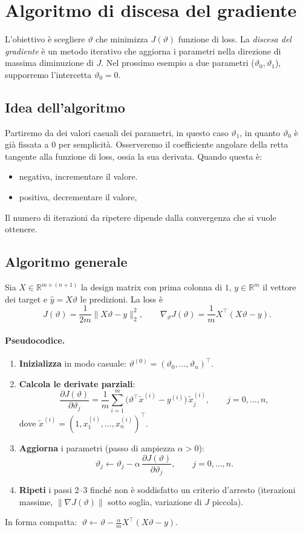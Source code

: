 \section{Algoritmo di discesa del gradiente}
L’obiettivo è scegliere \(\vartheta\) che minimizza \(J(\vartheta)\) funzione di loss. La \emph{discesa del gradiente}
è un metodo iterativo che aggiorna i parametri nella direzione di massima diminuzione di \(J\).
Nel prossimo esempio a due parametri ($\vartheta_0, \vartheta_1$), supporremo l'intercetta $\vartheta_0 = 0$.

\subsection{Idea dell'algoritmo}
Partiremo da dei valori casuali dei parametri, in questo caso $\vartheta_1$, in quanto $\vartheta_0$ è già fissata a 0 per semplicità.
Osserveremo il coefficiente angolare della retta tangente alla funzione di loss, ossia la sua derivata. Quando questa è:
\begin{itemize}
	\item negativa, incrementare il valore.
	\item positiva, decrementare il valore,
\end{itemize}

Il numero di iterazioni da ripetere dipende dalla convergenza che si vuole ottenere.

\subsection{Algoritmo generale}
Sia \(X\in\mathbb{R}^{m\times(n+1)}\) la design matrix con prima colonna di \(1\),
\(y\in\mathbb{R}^{m}\) il vettore dei target e \(\hat y=X\vartheta\) le predizioni. La loss è
\[
J(\vartheta)=\frac{1}{2m}\|X\vartheta-y\|_2^2,\qquad
\nabla_\vartheta J(\vartheta)=\frac{1}{m}X^\top(X\vartheta-y).
\]

\paragraph{Pseudocodice.}
\begin{enumerate}
  \item \textbf{Inizializza} in modo casuale: \(\vartheta^{(0)}=(\vartheta_0,\ldots,\vartheta_n)^\top\).
  \item \textbf{Calcola le derivate parziali}:
  \[
  \frac{\partial J(\vartheta)}{\partial \vartheta_j}
  =\frac{1}{m}\sum_{i=1}^m\big(\vartheta^\top \tilde x^{(i)}-y^{(i)}\big)\,\tilde x^{(i)}_j,\qquad j=0,\ldots,n,
  \]
  dove \(\tilde x^{(i)}=(1,x^{(i)}_1,\ldots,x^{(i)}_n)^\top\).
  \item \textbf{Aggiorna} i parametri (passo di ampiezza \(\alpha>0\)):
  \[
  \vartheta_j \leftarrow \vartheta_j - \alpha\,\frac{\partial J(\vartheta)}{\partial \vartheta_j},
  \qquad j=0,\ldots,n.
  \]
  \item \textbf{Ripeti} i passi 2–3 finché non è soddisfatto un criterio d’arresto
  (iterazioni massime, \(\|\nabla J(\vartheta)\|\) sotto soglia, variazione di \(J\) piccola).
\end{enumerate}
In forma compatta: \(\;\vartheta \leftarrow \vartheta - \frac{\alpha}{m}X^\top(X\vartheta-y)\).

